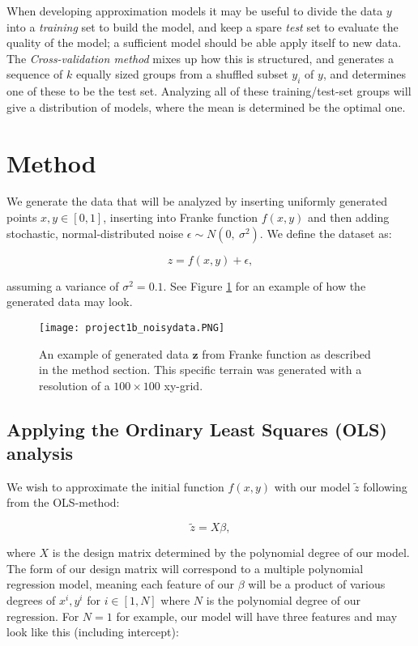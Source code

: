 \documentclass[reprint,english,notitlepage]{revtex4-1}  %
\begin{document}
When developing approximation models it may be useful to divide the data $y$ into a \textit{training} set to build the model, and keep a spare \textit{test} set to evaluate the quality of the model; a sufficient model should be able apply itself to new data. The \textit{Cross-validation method} mixes up how this is structured, and generates a sequence of $k$ equally sized groups from a shuffled subset $y_i$ of $y$, and determines one of these to be the test set. Analyzing all of these training/test-set groups will give a distribution of models, where the mean is determined be the optimal one.



\section{Method}

We generate the data that will be analyzed by inserting uniformly generated points $x, y \in [0, 1]$, inserting into Franke function $f(x, y)$ and then adding stochastic, normal-distributed noise $\epsilon \sim N(0, \ \sigma^2)$. We define the dataset as:

$$z = f(x, y) + \epsilon,$$

assuming a variance of $\sigma^2 = 0.1$. See Figure \ref{fig:noise} for an example of how the generated data may look.

\begin{figure}[h!]
    \centering
    \texttt{[image: project1b\_noisydata.PNG]}
    \caption{An example of generated data $\textbf{z}$ from Franke function as described in the method section. This specific terrain was generated with a resolution of a $100 \times 100$ xy-grid.}
    \label{fig:noise}
\end{figure}

\subsection{Applying the Ordinary Least Squares (OLS) analysis}
We wish to approximate the initial function $f(x, y)$ with our model $\tilde{z}$ following from the OLS-method:

$$\tilde{z} = X\beta,$$

where $X$ is the design matrix determined by the polynomial degree of our model. The form of our design matrix will correspond to a multiple polynomial regression model, meaning each feature of our $\beta$ will be a product of various degrees of $x^i, y^i$ for $i \in [1, N]$ where $N$ is the polynomial degree of our regression. For $N = 1$ for example, our model will have three features and may look like this (including intercept):
\end{document}
